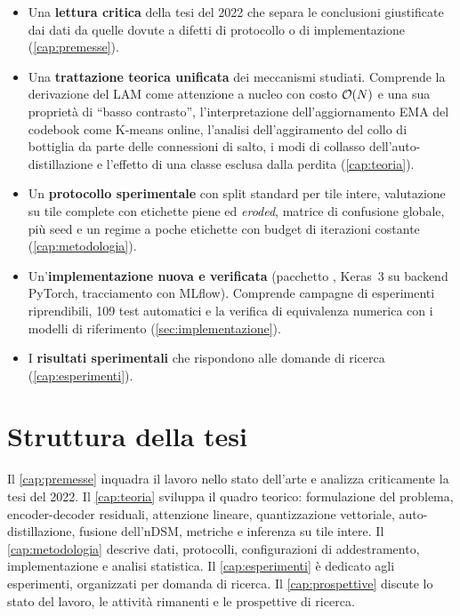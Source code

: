 \begin{itemize}
  \item Una \textbf{lettura critica} della tesi del 2022 che separa le conclusioni giustificate
  dai dati da quelle dovute a difetti di protocollo o di implementazione (\cref{cap:premesse}).
  \item Una \textbf{trattazione teorica unificata} dei meccanismi studiati. Comprende la
  derivazione del LAM come attenzione a nucleo con costo $\mathcal{O}\!\left(N\right)$ e una sua proprietà di
  \enquote{basso contrasto}, l'interpretazione dell'aggiornamento EMA del codebook come K-means
  online, l'analisi dell'aggiramento del collo di bottiglia da parte delle connessioni di salto,
  i modi di collasso dell'auto-distillazione e l'effetto di una classe esclusa dalla perdita
  (\cref{cap:teoria}).
  \item Un \textbf{protocollo sperimentale} con split standard per tile intere, valutazione su
  tile complete con etichette piene ed \emph{eroded}, matrice di confusione globale, più seed e
  un regime a poche etichette con budget di iterazioni costante (\cref{cap:metodologia}).
  \item Un'\textbf{implementazione nuova e verificata} (pacchetto \rsseg{}, Keras~3 su backend
  PyTorch, tracciamento con MLflow). Comprende campagne di esperimenti riprendibili, 109 test
  automatici e la verifica di equivalenza numerica con i modelli di riferimento
  (\cref{sec:implementazione}).
  \item I \textbf{risultati sperimentali} che rispondono alle domande di ricerca
  (\cref{cap:esperimenti}).
\end{itemize}

\section{Struttura della tesi}
\label{sec:struttura}

Il \cref{cap:premesse} inquadra il lavoro nello stato dell'arte e analizza criticamente la tesi
del 2022. Il \cref{cap:teoria} sviluppa il quadro teorico: formulazione del problema, encoder-decoder
residuali, attenzione lineare, quantizzazione vettoriale, auto-distillazione, fusione
dell'nDSM, metriche e inferenza su tile intere. Il \cref{cap:metodologia} descrive dati,
protocolli, configurazioni di addestramento, implementazione e analisi statistica. Il
\cref{cap:esperimenti} è dedicato agli esperimenti, organizzati per domanda di ricerca. Il
\cref{cap:prospettive} discute lo stato del lavoro, le attività rimanenti e le prospettive di
ricerca.
